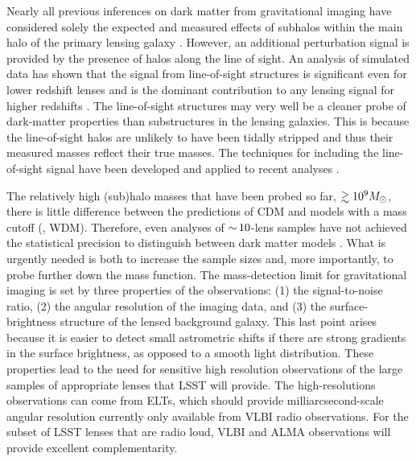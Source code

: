 Nearly all previous inferences on dark matter from gravitational imaging have considered solely the expected and measured effects of subhalos within the main halo of the primary lensing galaxy \citep[e.g.,][]{Vegetti:2009aa, Vegetti_2012, Vegetti2014, Hezaveh_2016ltk}.
However, an additional perturbation signal is provided by the presence of halos along the line of sight.
An analysis of simulated data has shown that the signal from line-of-sight structures is significant even for lower redshift lenses and is the dominant contribution to any lensing signal for higher redshifts \citep{Keeton:2002ug,Despali++18}.
The line-of-sight structures may very well be a cleaner probe of dark-matter properties than substructures in the lensing galaxies.
This is because the line-of-sight halos are unlikely to have been tidally stripped and thus their measured masses reflect their true masses.
The techniques for including the line-of-sight signal have been developed and applied to recent analyses \citep{Ritondale++18}. 
 
The relatively high (sub)halo masses that have been probed so far, $\gtrsim 10^9M_\odot$, there is little difference between the predictions of CDM and models with a mass cutoff (\eg, WDM).
Therefore, even analyses of $ {\sim}\,10$-lens samples have not achieved the statistical precision to distinguish between dark matter models \citep{Vegetti2014, Ritondale++18}.
What is urgently needed is both to increase the sample sizes and, more importantly, to probe further down the mass function.
The mass-detection limit for gravitational imaging is set by three properties of the observations: (1) the signal-to-noise ratio, (2) the angular resolution of the imaging data, and (3) the surface-brightness structure of the lensed background galaxy.  This last point arises because it is easier to detect small astrometric shifts if there are strong gradients in the surface brightness, as opposed to a smooth light distribution.
These properties lead to the need for sensitive high resolution observations of the large samples of appropriate lenses that LSST will provide.
The high-resolutions observations can come from ELTs, which should provide milliarcsecond-scale angular resolution currently only available from VLBI radio observations.
For the subset of LSST lenses that are radio loud, VLBI and ALMA observations will provide excellent complementarity.

\vspace{1em} 


